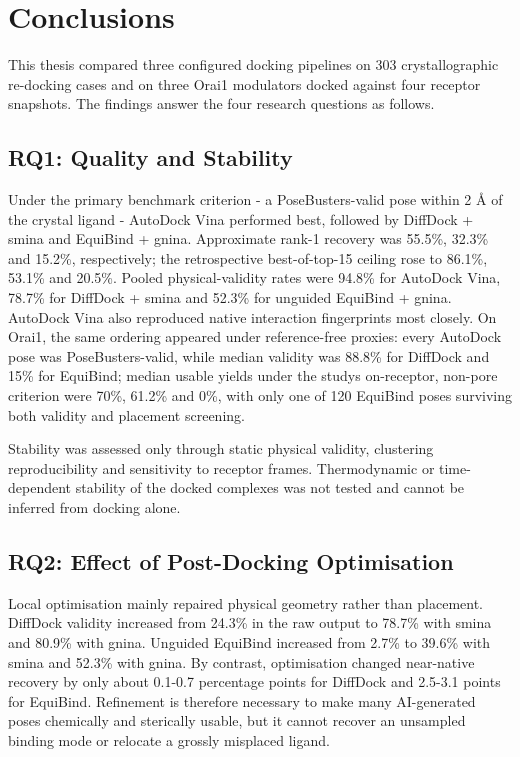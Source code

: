 \hypertarget{conclusions}{%
\chapter{\texorpdfstring{Conclusions }{Conclusions }}\label{conclusions}}

This thesis compared three configured docking pipelines on 303 crystallographic re-docking cases and on three Orai1 modulators docked against four receptor snapshots. The findings answer the four research questions as follows.

\hypertarget{rq1-quality-and-stability}{%
\section{RQ1: Quality and Stability}\label{rq1-quality-and-stability}}

Under the primary benchmark criterion - a PoseBusters-valid pose within 2 Å of the crystal ligand - AutoDock Vina performed best, followed by DiffDock + smina and EquiBind + gnina. Approximate rank-1 recovery was 55.5\%, 32.3\% and 15.2\%, respectively; the retrospective best-of-top-15 ceiling rose to 86.1\%, 53.1\% and 20.5\%. Pooled physical-validity rates were 94.8\% for AutoDock Vina, 78.7\% for DiffDock + smina and 52.3\% for unguided EquiBind + gnina. AutoDock Vina also reproduced native interaction fingerprints most closely. On Orai1, the same ordering appeared under reference-free proxies: every AutoDock pose was PoseBusters-valid, while median validity was 88.8\% for DiffDock and 15\% for EquiBind; median usable yields under the study\textquotesingle s on-receptor, non-pore criterion were 70\%, 61.2\% and 0\%, with only one of 120 EquiBind poses surviving both validity and placement screening.

Stability was assessed only through static physical validity, clustering reproducibility and sensitivity to receptor frames. Thermodynamic or time-dependent stability of the docked complexes was not tested and cannot be inferred from docking alone.

\hypertarget{rq2-effect-of-post-docking-optimisation}{%
\section{RQ2: Effect of Post-Docking Optimisation}\label{rq2-effect-of-post-docking-optimisation}}

Local optimisation mainly repaired physical geometry rather than placement. DiffDock validity increased from 24.3\% in the raw output to 78.7\% with smina and 80.9\% with gnina. Unguided EquiBind increased from 2.7\% to 39.6\% with smina and 52.3\% with gnina. By contrast, optimisation changed near-native recovery by only about 0.1-0.7 percentage points for DiffDock and 2.5-3.1 points for EquiBind. Refinement is therefore necessary to make many AI-generated poses chemically and sterically usable, but it cannot recover an unsampled binding mode or relocate a grossly misplaced ligand.

